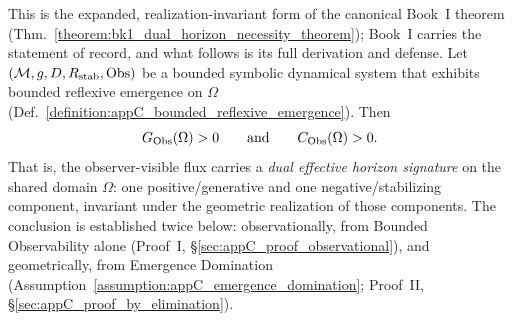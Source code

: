 \begin{theorem}
\label{theorem:appC_dual_horizon_signature}
This is the expanded, realization-invariant form of the canonical Book~I theorem
(Thm.~\ref{theorem:bk1_dual_horizon_necessity_theorem}); Book~I carries the
statement of record, and what follows is its full derivation and defense.
Let \((\mathcal{M}, g, D, R_{\mathrm{stab}}, \mathrm{Obs})\) be a bounded symbolic
dynamical system that exhibits bounded reflexive emergence on \(\Omega\)
(Def.~\ref{definition:appC_bounded_reflexive_emergence}). Then
\[
G_{\mathrm{Obs}}(\Omega) > 0 \qquad\text{and}\qquad C_{\mathrm{Obs}}(\Omega) > 0 .
\]
That is, the observer-visible flux carries a \emph{dual effective horizon signature}
on the shared domain \(\Omega\): one positive/generative and one
negative/stabilizing component, invariant under the geometric realization of those
components. The conclusion is established twice below: observationally, from Bounded
Observability alone (Proof~I, \S\ref{sec:appC_proof_observational}), and
geometrically, from Emergence Domination
(Assumption~\ref{assumption:appC_emergence_domination}; Proof~II,
\S\ref{sec:appC_proof_by_elimination}).
\end{theorem}

